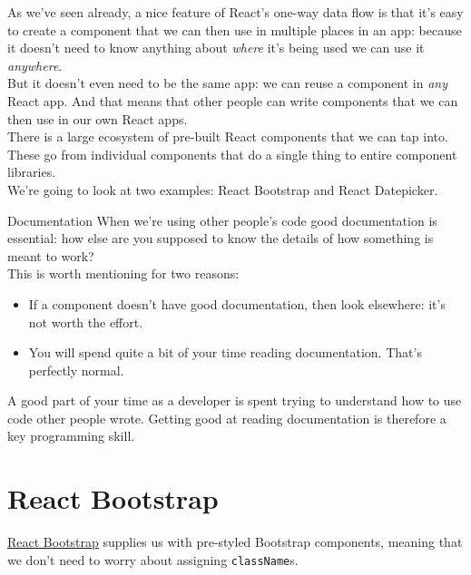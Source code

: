 As we've seen already, a nice feature of React's one-way data flow is that it's easy to create a component that we can then use in multiple places in an app: because it doesn't need to know anything about \textit{where} it's being used we can use it \textit{anywhere}.
\\

But it doesn't even need to be the same app: we can reuse a component in \textit{any} React app. And that means that other people can write components that we can then use in our own React apps.
\\

There is a large ecosystem of pre-built React components that we can tap into. These go from individual components that do a single thing to entire component libraries.
\\

We're going to look at two examples: React Bootstrap and React Datepicker.

\begin{infobox}{Documentation}
    When we're using other people's code good documentation is essential: how else are you supposed to know the details of how something is meant to work?
    \\

    This is worth mentioning for two reasons:

    \begin{itemize}
        \item If a component doesn't have good documentation, then look elsewhere: it's not worth the effort.
        \item You will spend quite a bit of your time reading documentation. That's perfectly normal.
    \end{itemize}

    A good part of your time as a developer is spent trying to understand how to use code other people wrote. Getting good at reading documentation is therefore a key programming skill.
\end{infobox}

\section{React Bootstrap}

\href{https://react-bootstrap.github.io}{React Bootstrap} supplies us with pre-styled Bootstrap components, meaning that we don't need to worry about assigning \texttt{className}s.
\\

